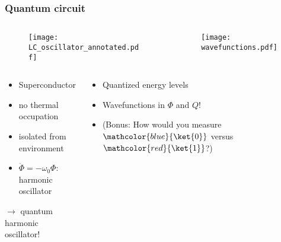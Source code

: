 \begin{frame}
\frametitle{Quantum circuit}
\begin{columns}
  \begin{column}{0.5\textwidth}
    \begin{figure}
      \texttt{[image: LC\_oscillator\_annotated.pdf]}
    \end{figure}
  \end{column}
  \begin{column}{0.5\textwidth}
    \begin{figure}
      \texttt{[image: wavefunctions.pdf]}
    \end{figure}
  \end{column}
\end{columns}
\begin{columns}
  \begin{column}{0.5\textwidth}
    \begin{itemize}
      \item Superconductor
      \item no thermal occupation
      \item isolated from environment
      \item $\ddot{\Phi} = -\omega_0 \Phi$: harmonic oscillator
    \end{itemize}
    $\rightarrow$ quantum harmonic oscillator!
  \end{column}
  \begin{column}{0.5\textwidth}
    \begin{itemize}
      \item Quantized energy levels
      \item Wavefunctions in $\Phi$ and $Q$!
      \item (Bonus: How would you measure $\mathcolor{blue}{\ket{0}}$ versus $\mathcolor{red}{\ket{1}}$?)
    \end{itemize}
  \end{column}
\end{columns}
\end{frame}
